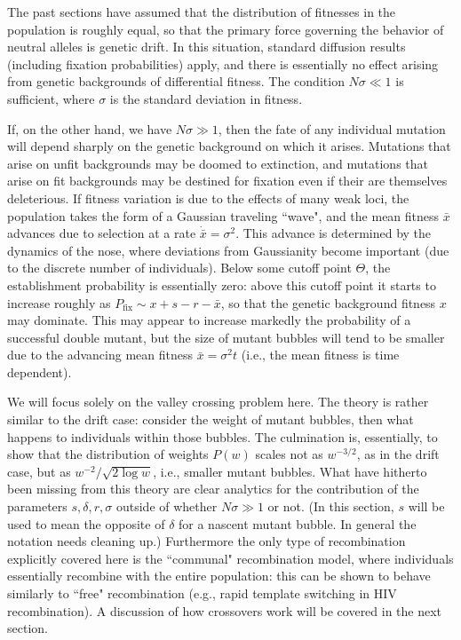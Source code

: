 \documentclass[10pt]{revtex4}
\begin{document}
The past sections have assumed that the distribution of fitnesses in the population is roughly equal, so that the primary force governing the behavior of neutral alleles is genetic drift.
In this situation, standard diffusion results (including fixation probabilities) apply, and there is essentially no effect arising from genetic backgrounds of differential fitness.
The condition $N\sigma \ll 1$ is sufficient, where $\sigma$ is the standard deviation in fitness.

If, on the other hand, we have $N\sigma \gg 1$, then the fate of any individual mutation will depend sharply on the genetic background on which it arises.
Mutations that arise on unfit backgrounds may be doomed to extinction, and mutations that arise on fit backgrounds may be destined for fixation even if their are themselves deleterious.
If fitness variation is due to the effects of many weak loci, the population takes the form of a Gaussian traveling ``wave", and the mean fitness $\bar{x}$ advances due to selection at a rate $\dot{\bar{x}} = \sigma^2$.
This advance is determined by the dynamics of the nose, where deviations from Gaussianity become important (due to the discrete number of individuals).
Below some cutoff point $\Theta$, the establishment probability is essentially zero: above this cutoff point it starts to increase roughly as $P_\mathrm{fix} \sim x+s-r-\bar{x}$, so that the genetic background fitness $x$ may dominate.
This may appear to increase markedly the probability of a successful double mutant, but the size of mutant bubbles will tend to be smaller due to the advancing mean fitness $\bar{x} = \sigma^2t$ (i.e., the mean fitness is time dependent).

We will focus solely on the valley crossing problem here.
The theory is rather similar to the drift case: consider the weight of mutant bubbles, then what happens to individuals within those bubbles.
The culmination is, essentially, to show that the distribution of weights $P(w)$ scales not as $w^{-3/2}$, as in the drift case, but as $w^{-2}/\sqrt{2 \log w}$, i.e., smaller mutant bubbles.
What have hitherto been missing from this theory are clear analytics for the contribution of the parameters $s, \delta, r, \sigma$ outside of whether $N\sigma \gg 1$ or not.
(In this section, $s$ will be used to mean the opposite of $\delta$ for a nascent mutant bubble.
In general the notation needs cleaning up.)
Furthermore the only type of recombination explicitly covered here is the ``communal" recombination model, where individuals essentially recombine with the entire population: this can be shown to behave similarly to ``free" recombination (e.g., rapid template switching in HIV recombination).
A discussion of how crossovers work will be covered in the next section.
\end{document}
